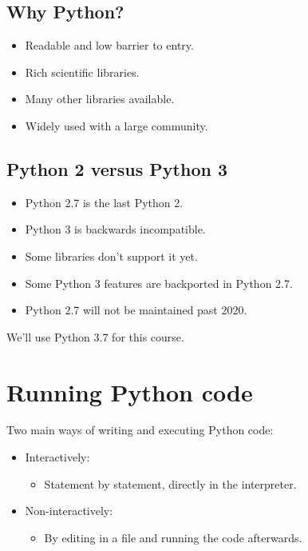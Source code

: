 \documentclass[aspectratio=1610,slidestop]{beamer}
\begin{document}
\subsection{Why Python?}
\begin{pframe}
 \begin{itemize}
  \item Readable and low barrier to entry.
  \item Rich scientific libraries.
  \item Many other libraries available.
  \item Widely used with a large community.
 \end{itemize}
\end{pframe}


\subsection{Python 2 versus Python 3}
\begin{pframe}
 \begin{itemize}
  \item Python 2.7 is the last Python 2.
  \item Python 3 is backwards incompatible.
  \item Some libraries don't support it yet.
  \item Some Python 3 features are backported in Python 2.7.
  \item Python 2.7 will not be maintained past 2020.
 \end{itemize}
  We'll use Python 3.7 for this course.
\end{pframe}


\section{Running Python code}

\begin{pframe}
  Two main ways of writing and executing Python code:
  \begin{itemize}
    \item Interactively:
    \begin{itemize}
     \item Statement by statement, directly in the interpreter.
    \end{itemize}
    \item Non-interactively:
    \begin{itemize}
     \item By editing in a file and running the code afterwards.
    \end{itemize}
  \end{itemize}
\end{pframe}
\end{document}
